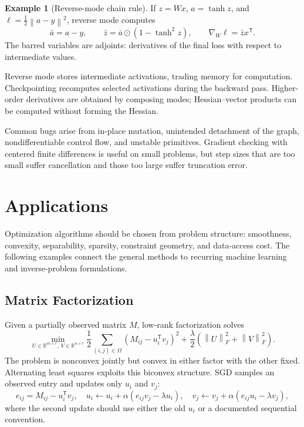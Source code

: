 \documentclass[12pt,oneside]{book}
\numberwithin{equation}{section}
\theoremstyle{definition}
\newtheorem{example}{Example}[section]
\theoremstyle{plain}
\theoremstyle{remark}
\newcommand{\R}{\mathbb{R}}
\newcommand{\norm}[1]{\left\lVert #1 \right\rVert}
\newcommand{\grad}{\nabla}
\begin{document}
\begin{example}[Reverse-mode chain rule]
If $z=Wx$, $a=\tanh z$, and $\ell=\tfrac12\norm{a-y}^2$, reverse mode computes
\[
 \bar a=a-y,\qquad
 \bar z=\bar a\odot(1-\tanh^2z),\qquad
 \grad_W\ell=\bar z x^\mathsf T.
\]
The barred variables are adjoints: derivatives of the final loss with respect
to intermediate values.
\end{example}

Reverse mode stores intermediate activations, trading memory for computation.
Checkpointing recomputes selected activations during the backward pass.
Higher-order derivatives are obtained by composing modes; Hessian--vector
products can be computed without forming the Hessian.

Common bugs arise from in-place mutation, unintended detachment of the graph,
nondifferentiable control flow, and unstable primitives. Gradient checking
with centered finite differences is useful on small problems, but step sizes
that are too small suffer cancellation and those too large suffer truncation
error.

\section{Applications}

Optimization algorithms should be chosen from problem structure: smoothness,
convexity, separability, sparsity, constraint geometry, and data-access cost.
The following examples connect the general methods to recurring machine
learning and inverse-problem formulations.

\subsection{Matrix Factorization}

Given a partially observed matrix $M$, low-rank factorization solves
\begin{equation}
 \min_{U\in\R^{m\times r},\,V\in\R^{n\times r}}
 \frac12\sum_{(i,j)\in\Omega}
 (M_{ij}-u_i^\mathsf Tv_j)^2
 +\frac\lambda2(\norm U_F^2+\norm V_F^2).
 \label{eq:matrix-factorization}
\end{equation}
The problem is nonconvex jointly but convex in either factor with the other
fixed. Alternating least squares exploits this biconvex structure. SGD samples
an observed entry and updates only $u_i$ and $v_j$:
\[
 e_{ij}=M_{ij}-u_i^\mathsf Tv_j,\quad
 u_i\leftarrow u_i+\alpha(e_{ij}v_j-\lambda u_i),\quad
 v_j\leftarrow v_j+\alpha(e_{ij}u_i-\lambda v_j),
\]
where the second update should use either the old $u_i$ or a documented
sequential convention.
\end{document}
